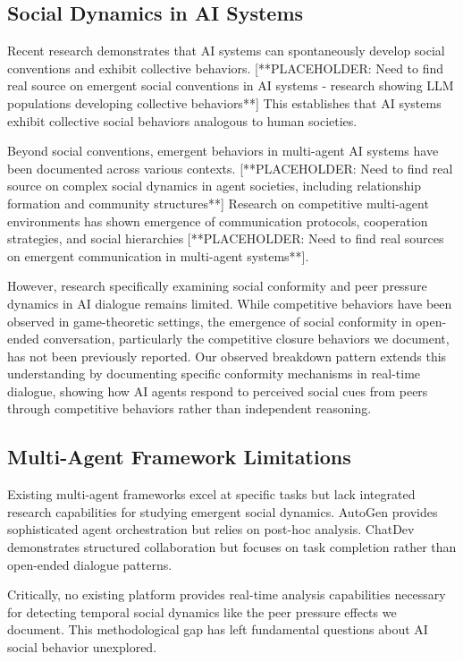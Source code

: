 \documentclass[11pt,letterpaper]{article}
\begin{document}
\subsection{Social Dynamics in AI Systems}

Recent research demonstrates that AI systems can spontaneously develop social conventions and exhibit collective behaviors. [**PLACEHOLDER: Need to find real source on emergent social conventions in AI systems - research showing LLM populations developing collective behaviors**] This establishes that AI systems exhibit collective social behaviors analogous to human societies.

Beyond social conventions, emergent behaviors in multi-agent AI systems have been documented across various contexts. [**PLACEHOLDER: Need to find real source on complex social dynamics in agent societies, including relationship formation and community structures**] Research on competitive multi-agent environments has shown emergence of communication protocols, cooperation strategies, and social hierarchies [**PLACEHOLDER: Need to find real sources on emergent communication in multi-agent systems**].

However, research specifically examining social conformity and peer pressure dynamics in AI dialogue remains limited. While competitive behaviors have been observed in game-theoretic settings, the emergence of social conformity in open-ended conversation, particularly the competitive closure behaviors we document, has not been previously reported. Our observed breakdown pattern extends this understanding by documenting specific conformity mechanisms in real-time dialogue, showing how AI agents respond to perceived social cues from peers through competitive behaviors rather than independent reasoning.

\subsection{Multi-Agent Framework Limitations}

Existing multi-agent frameworks excel at specific tasks but lack integrated research capabilities for studying emergent social dynamics. AutoGen \citep{wu2023autogen} provides sophisticated agent orchestration but relies on post-hoc analysis. ChatDev \citep{qian2023chatdev} demonstrates structured collaboration but focuses on task completion rather than open-ended dialogue patterns.

Critically, no existing platform provides real-time analysis capabilities necessary for detecting temporal social dynamics like the peer pressure effects we document. This methodological gap has left fundamental questions about AI social behavior unexplored.
\end{document}
